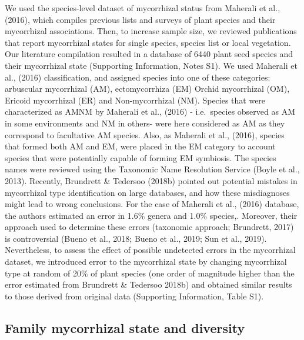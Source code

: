 \documentclass[12pt,]{article}
\begin{document}
We used the species-level dataset of mycorrhizal status from Maherali et
al., (2016), which compiles previous lists and surveys of plant species
and their mycorrhizal associations. Then, to increase sample size, we
reviewed publications that report mycorrhizal states for single species,
species list or local vegetation. Our literature compilation resulted in
a database of 6440 plant seed species and their mycorrhizal state
(Supporting Information, Notes S1). We used Maherali et al., (2016)
classification, and assigned species into one of these categories:
arbuscular mycorrhizal (AM), ectomycorrhiza (EM) Orchid mycorrhizal
(OM), Ericoid mycorrhizal (ER) and Non-mycorrhizal (NM). Species that
were characterized as AMNM by Maherali et al., (2016) - i.e.~species
observed as AM in some environments and NM in others- were here
considered as AM as they correspond to facultative AM species. Also, as
Maherali et al., (2016), species that formed both AM and EM, were placed
in the EM category to account species that were potentially capable of
forming EM symbiosis. The species names were reviewed using the
Taxonomic Name Resolution Service (Boyle et al., 2013). Recently,
Brundrett \& Tedersoo (2018b) pointed out potential mistakes in
mycorrhizal type identification on large databases, and how these
misdiagnoses might lead to wrong conclusions. For the case of Maherali
et al., (2016) database, the authors estimated an error in 1.6\% genera
and 1.0\% species,. Moreover, their approach used to determine these
errors (taxonomic approach; Brundrett, 2017) is controversial (Bueno et
al., 2018; Bueno et al., 2019; Sun et al., 2019). Nevertheless, to
assess the effect of possible undetected errors in the mycorrhizal
dataset, we introduced error to the mycorrhizal state by changing
mycorrhizal type at random of 20\% of plant species (one order of
magnitude higher than the error estimated from Brundrett \& Tedersoo
2018b) and obtained similar results to those derived from original data
(Supporting Information, Table S1).

\hypertarget{family-mycorrhizal-state-and-diversity}{%
\subsection{Family mycorrhizal state and
diversity}\label{family-mycorrhizal-state-and-diversity}}
\end{document}
